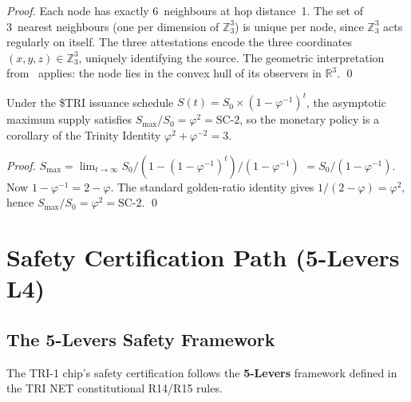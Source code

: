 \begin{proof}
Each node has exactly 6~neighbours at hop distance~1.
The set of 3~nearest neighbours (one per dimension of \(\mathbb{Z}_3^3\)) is
unique per node, since \(\mathbb{Z}_3^3\) acts regularly on itself.
The three attestations encode the three coordinates
\((x, y, z) \in \mathbb{Z}_3^3\), uniquely identifying the source.
The geometric interpretation from~\cite{milionis2025incentive} applies:
the node lies in the convex hull of its observers in \(\mathbb{R}^3\).
\qed
\end{proof}

\begin{theorem}\label{thm:token-supply}
Under the \$TRI issuance schedule \(S(t) = S_0 \times (1 - \varphi^{-1})^t\),
the asymptotic maximum supply satisfies
\(S_{\max} / S_0 = \varphi^2 = \mathrm{SC\text{-}2}\),
so the monetary policy is a corollary of the Trinity Identity
\(\varphi^2 + \varphi^{-2} = 3\).
\end{theorem}

\begin{proof}
\(S_{\max} = \lim_{t \to \infty} S_0 / (1 - (1-\varphi^{-1})^t) / (1-\varphi^{-1})\)
\(= S_0 / (1 - \varphi^{-1})\).
Now \(1 - \varphi^{-1} = 2 - \varphi\).
The standard golden-ratio identity gives \(1/(2-\varphi) = \varphi^2\), hence
\(S_{\max}/S_0 = \varphi^2 = \mathrm{SC\text{-}2}\).
\qed
\end{proof}


\section{Safety Certification Path (5-Levers L4)}
\label{sec:flos74-safety}

\subsection{The 5-Levers Safety Framework}

The TRI-1 chip's safety certification follows the \textbf{5-Levers} framework
defined in the TRI NET constitutional R14/R15 rules.

